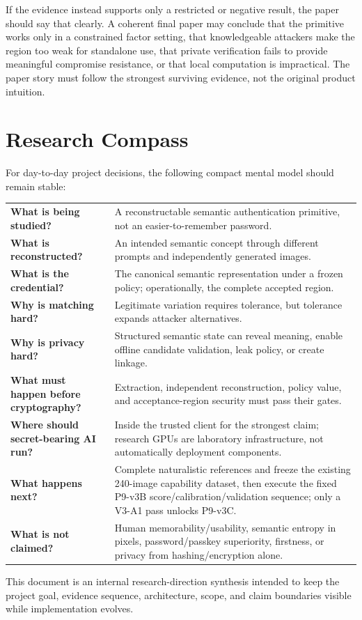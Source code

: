 \documentclass[11pt,a4paper]{article}
\begin{document}
If the evidence instead supports only a restricted or negative result, the paper should say that clearly. A coherent final paper may conclude that the primitive works only in a constrained factor setting, that knowledgeable attackers make the region too weak for standalone use, that private verification fails to provide meaningful compromise resistance, or that local computation is impractical. The paper story must follow the strongest surviving evidence, not the original product intuition.

\section{Research Compass}

For day-to-day project decisions, the following compact mental model should remain stable:

\begin{center}
\begin{tabularx}{0.95\textwidth}{>{\bfseries}p{} X}
What is being studied? & A reconstructable semantic authentication primitive, not an easier-to-remember password. \\
What is reconstructed? & An intended semantic concept through different prompts and independently generated images. \\
What is the credential? & The canonical semantic representation under a frozen policy; operationally, the complete accepted region. \\
Why is matching hard? & Legitimate variation requires tolerance, but tolerance expands attacker alternatives. \\
Why is privacy hard? & Structured semantic state can reveal meaning, enable offline candidate validation, leak policy, or create linkage. \\
What must happen before cryptography? & Extraction, independent reconstruction, policy value, and acceptance-region security must pass their gates. \\
Where should secret-bearing AI run? & Inside the trusted client for the strongest claim; research GPUs are laboratory infrastructure, not automatically deployment components. \\
What happens next? & Complete naturalistic references and freeze the existing 240-image capability dataset, then execute the fixed P9-v3B score/calibration/validation sequence; only a V3-A1 pass unlocks P9-v3C. \\
What is not claimed? & Human memorability/usability, semantic entropy in pixels, password/passkey superiority, firstness, or privacy from hashing/encryption alone. \\
\end{tabularx}
\end{center}

\vfill
\begin{center}
\small\color{SSGray}
This document is an internal research-direction synthesis intended to keep the project goal, evidence sequence, architecture, scope, and claim boundaries visible while implementation evolves.
\end{center}
\end{document}
